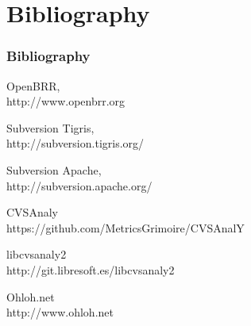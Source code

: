 \documentclass[xcolor=dvipsnames]{beamer}
\begin{document}
\section{Bibliography}
\begin{frame}[allowframebreaks]
\frametitle{Bibliography}
\begin{thebibliography}{9}

    OpenBRR,\\
    http://www.openbrr.org

  Subversion Tigris,\\
  http://subversion.tigris.org/

  Subversion Apache,\\
  http://subversion.apache.org/

    CVSAnaly\\
    https://github.com/MetricsGrimoire/CVSAnalY

    libcvsanaly2\\
    http://git.libresoft.es/libcvsanaly2

    Ohloh.net\\
    http://www.ohloh.net

\end{thebibliography}
\end{frame}
\end{document}
